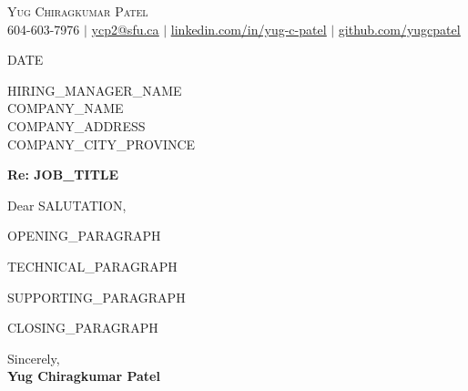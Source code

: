 \documentclass[letterpaper,11pt]{article}
\begin{document}
\begin{center}
    {\Huge \scshape \textcolor{primarycolor}{Yug Chiragkumar Patel}} \\ \vspace{1pt}
    \small 604-603-7976 $|$ \href{mailto:ycp2@sfu.ca}{\underline{ycp2@sfu.ca}} $|$
    \href{https://linkedin.com/in/yug-c-patel}{\underline{linkedin.com/in/yug-c-patel}} $|$
    \href{https://github.com/yugcpatel}{\underline{github.com/yugcpatel}}
\end{center}

\vspace{4pt}

{{DATE}}

\vspace{4pt}

{{HIRING_MANAGER_NAME}} \\
{{COMPANY_NAME}} \\
{{COMPANY_ADDRESS}} \\
{{COMPANY_CITY_PROVINCE}}

\vspace{4pt}

\textbf{Re: {{JOB_TITLE}}}

\vspace{4pt}

Dear {{SALUTATION}},

{{OPENING_PARAGRAPH}}

{{TECHNICAL_PARAGRAPH}}

{{SUPPORTING_PARAGRAPH}}

{{CLOSING_PARAGRAPH}}

\vspace{8pt}

Sincerely, \\[18pt]
\textbf{Yug Chiragkumar Patel}
\end{document}
